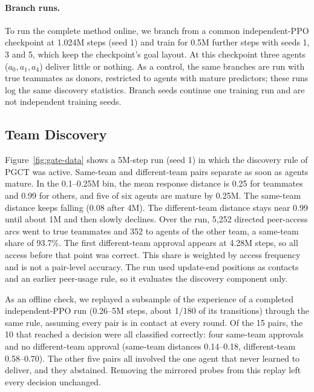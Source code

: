 \documentclass{article}
\begin{document}
\paragraph{Branch runs.} To run the complete method online, we branch from a common independent-PPO checkpoint at 1.024M steps (seed 1) and train for 0.5M further steps with seeds 1, 3 and 5, which keep the checkpoint's goal layout. At this checkpoint three agents ($a_0,a_1,a_4$) deliver little or nothing. As a control, the same branches are run with true teammates as donors, restricted to agents with mature predictors; these runs log the same discovery statistics. Branch seeds continue one training run and are not independent training seeds.

\subsection{Team Discovery}\label{sec:discovery}
Figure~\ref{fig:gate-data} shows a 5M-step run (seed 1) in which the discovery rule of PGCT was active. Same-team and different-team pairs separate as soon as agents mature. In the 0.1--0.25M bin, the mean response distance is 0.25 for teammates and 0.99 for others, and five of six agents are mature by 0.25M. The same-team distance keeps falling (0.08 after 4M). The different-team distance stays near 0.99 until about 1M and then slowly declines. Over the run, 5{,}252 directed peer-access arcs went to true teammates and 352 to agents of the other team, a same-team share of 93.7\%. The first different-team approval appears at 4.28M steps, so all access before that point was correct. This share is weighted by access frequency and is not a pair-level accuracy. The run used update-end positions as contacts and an earlier peer-usage rule, so it evaluates the discovery component only.

As an offline check, we replayed a subsample of the experience of a completed independent-PPO run (0.26--5M steps, about 1/180 of its transitions) through the same rule, assuming every pair is in contact at every round. Of the 15 pairs, the 10 that reached a decision were all classified correctly: four same-team approvals and no different-team approval (same-team distances 0.14--0.18, different-team 0.58--0.70). The other five pairs all involved the one agent that never learned to deliver, and they abstained. Removing the mirrored probes from this replay left every decision unchanged.
\end{document}
